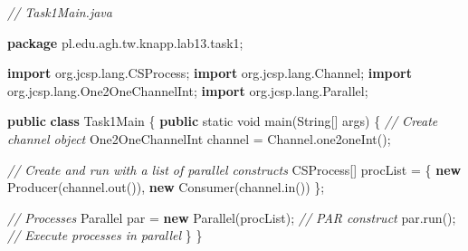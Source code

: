 \documentclass[11pt]{article}
\newenvironment{Shaded}{}{}
\newcommand{\KeywordTok}[1]{\textcolor[rgb]{0.00,0.44,0.13}{\textbf{{#1}}}}
\newcommand{\DataTypeTok}[1]{\textcolor[rgb]{0.56,0.13,0.00}{{#1}}}
\newcommand{\CommentTok}[1]{\textcolor[rgb]{0.38,0.63,0.69}{\textit{{#1}}}}
\newcommand{\FunctionTok}[1]{\textcolor[rgb]{0.02,0.16,0.49}{{#1}}}
\newcommand{\NormalTok}[1]{{#1}}
\newcommand{\ImportTok}[1]{{#1}}
\newcommand{\OperatorTok}[1]{\textcolor[rgb]{0.40,0.40,0.40}{{#1}}}
\newcommand{\BuiltInTok}[1]{{#1}}
\begin{document}
    \begin{Shaded}
\begin{Highlighting}[]
\CommentTok{// Task1Main.java}

\KeywordTok{package}\ImportTok{ pl}\OperatorTok{.}\ImportTok{edu}\OperatorTok{.}\ImportTok{agh}\OperatorTok{.}\ImportTok{tw}\OperatorTok{.}\ImportTok{knapp}\OperatorTok{.}\ImportTok{lab13}\OperatorTok{.}\ImportTok{task1}\OperatorTok{;}

\KeywordTok{import} \ImportTok{org}\OperatorTok{.}\ImportTok{jcsp}\OperatorTok{.}\ImportTok{lang}\OperatorTok{.}\ImportTok{CSProcess}\OperatorTok{;}
\KeywordTok{import} \ImportTok{org}\OperatorTok{.}\ImportTok{jcsp}\OperatorTok{.}\ImportTok{lang}\OperatorTok{.}\ImportTok{Channel}\OperatorTok{;}
\KeywordTok{import} \ImportTok{org}\OperatorTok{.}\ImportTok{jcsp}\OperatorTok{.}\ImportTok{lang}\OperatorTok{.}\ImportTok{One2OneChannelInt}\OperatorTok{;}
\KeywordTok{import} \ImportTok{org}\OperatorTok{.}\ImportTok{jcsp}\OperatorTok{.}\ImportTok{lang}\OperatorTok{.}\ImportTok{Parallel}\OperatorTok{;}

\KeywordTok{public} \KeywordTok{class}\NormalTok{ Task1Main }\OperatorTok{\{}
    \KeywordTok{public} \DataTypeTok{static} \DataTypeTok{void} \FunctionTok{main}\OperatorTok{(}\BuiltInTok{String}\OperatorTok{[]}\NormalTok{ args}\OperatorTok{)} \OperatorTok{\{}
        \CommentTok{// Create channel object}
\NormalTok{        One2OneChannelInt channel }\OperatorTok{=} \BuiltInTok{Channel}\OperatorTok{.}\FunctionTok{one2oneInt}\OperatorTok{();}

        \CommentTok{// Create and run with a list of parallel constructs}
\NormalTok{        CSProcess}\OperatorTok{[]}\NormalTok{ procList }\OperatorTok{=} \OperatorTok{\{}
            \KeywordTok{new} \FunctionTok{Producer}\OperatorTok{(}\NormalTok{channel}\OperatorTok{.}\FunctionTok{out}\OperatorTok{()),}
            \KeywordTok{new} \FunctionTok{Consumer}\OperatorTok{(}\NormalTok{channel}\OperatorTok{.}\FunctionTok{in}\OperatorTok{())}
        \OperatorTok{\};}

        \CommentTok{// Processes}
\NormalTok{        Parallel par }\OperatorTok{=} \KeywordTok{new} \FunctionTok{Parallel}\OperatorTok{(}\NormalTok{procList}\OperatorTok{);} \CommentTok{// PAR construct}
\NormalTok{        par}\OperatorTok{.}\FunctionTok{run}\OperatorTok{();} \CommentTok{// Execute processes in parallel}
    \OperatorTok{\}}
\OperatorTok{\}}
\end{Highlighting}
\end{Shaded}
\end{document}
